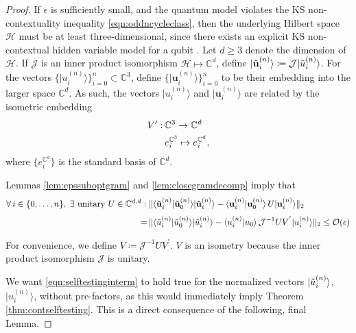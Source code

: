\begin{proof}
If $\epsilon$ is sufficiently small, and the quantum model violates the KS non-contextuality inequality \ref{eqn:oddncycleclass}, then the underlying Hilbert space $\mathcal{H}$ must be at least three-dimensional, since there exists an explicit KS non-contextual hidden variable model for a qubit \cite{Mermin1993}. Let $d\geq3$ denote the dimension of $\mathcal{H}$. If $\mathcal{J}$ is an inner product isomorphism $\mathcal{H}\mapsto\mathbb{C}^d$, define $\vert \Tilde{\mathbf{u}}_i^{(n)}\rangle \coloneqq \mathcal{J} \vert \Tilde{u}_i^{(n)}\rangle$.
For the vectors $\{\vert u_i^{(n)}\rangle \}_{i=0}^n\subset\mathbb{C}^3$, define $\{\vert \mathbf{u}_i^{(n)}\rangle \}_{i=0}^n$ to be their embedding into the larger space $\mathbb{C}^d$. As such, the vectors $\vert u_i^{(n)}\rangle$ and $\vert \mathbf{u}_i^{(n)}\rangle$ are related by the isometric embedding 
\begin{align*}
    V':\thinspace & \mathbb{C}^3\rightarrow\mathbb{C}^d \\
    & e_i^{\mathbb{C}^3} \mapsto e_i^{\mathbb{C}^d},
\end{align*}
where $\{e_i^{\mathbb{C}^d}\}$ is the standard basis of $\mathbb{C}^d$.

Lemmas \ref{lem:epssuboptgram} and \ref{lem:closegramdecomp} imply that 
\begin{align}
\label{eqn:selftestinginterm}
\begin{split}
    \forall\thinspace i\in\{0,\dots,n\},\; \exists \text{ unitary } U\in\mathbb{C}^{d,d}: \; & \| \langle \mathbf{\Tilde{u}}_i^{(n)} \vert \mathbf{\Tilde{u}}_0^{(n)} \rangle \vert \mathbf{\Tilde{u}}_i^{(n)} \rangle - \langle \mathbf{u}_i^{(n)} \vert \mathbf{u}_0^{(n)} \rangle \thinspace U\vert \mathbf{u}_i^{(n)}\rangle\|_2 \\[0.3em]
    = \thinspace & \| \langle \Tilde{u}_i^{(n)} \vert \Tilde{u}_0^{(n)} \rangle \vert \Tilde{u}_i^{(n)} \rangle - \langle u_i^{(n)} \vert u_0 \rangle \thinspace \mathcal{J}^{-1}UV^{'} \vert u_i^{(n)}\rangle\|_2 \leq \mathcal{O}(\epsilon)
\end{split}
\end{align}

For convenience, we define $V\coloneqq \mathcal{J}^{-1}UV^{'}$. $V$ is an isometry because the inner product isomorphism $\mathcal{J}$ is unitary. 

We want \ref{eqn:selftestinginterm} to hold true for the normalized vectors $\vert \Tilde{u}_i^{(n)} \rangle$, $\vert u_i^{(n)}\rangle$, without pre-factors, as this would immediately imply Theorem \ref{thm:contselftesting}. This is a direct consequence of the following, final Lemma.
\end{proof}

